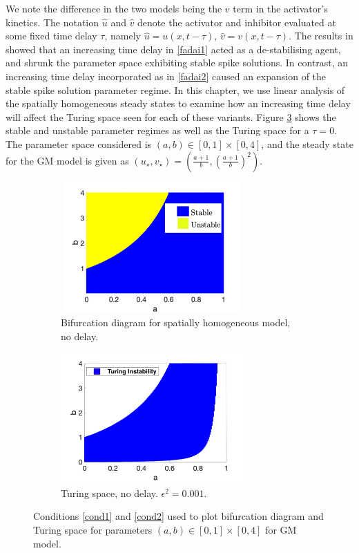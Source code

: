 We note the difference in the two models being the $v$ term in the activator's kinetics. The notation $\hat{u}$ and $\hat{v}$ denote the activator and inhibitor evaluated at some fixed time delay $\tau$, namely $\hat{u}=u(x,t-\tau)$, $\hat{v}=v(x,t-\tau)$. The results in \cite{fadai1,fadai2} showed that an increasing time delay in \eqref{fadai1} acted as a de-stabilising agent, and shrunk the parameter space exhibiting stable spike solutions. In contrast, an increasing time delay incorporated as in \eqref{fadai2} caused an expansion of the stable spike solution parameter regime. In this chapter, we use linear analysis of the spatially homogeneous steady states to examine how an increasing time delay will affect the Turing space seen for each of these variants. Figure \ref{fig:gmspace} shows the stable and unstable parameter regimes as well as the Turing space for a $\tau=0$. The parameter space considered is $(a,b)\in[0,1]\times[0,4]$, and the steady state for the GM model is given as $(u_\star,v_\star)=\left(\frac{a+1}{b},\left(\frac{a+1}{b}\right)^2\right)$.

\begin{figure}[H]
    \centering
    \begin{subfigure}[t]{0.45\textwidth}
        \centering
        \includegraphics[width=7cm,height = 5cm]{bifgm.png}
        \caption{Bifurcation diagram for spatially homogeneous model, no delay.}
        \label{fig:bifgm}
    \end{subfigure}
    \hfill
    \begin{subfigure}[t]{0.45\textwidth}
        \centering
        \includegraphics[width=7cm,height = 5cm]{turingspacegm.png}
        \caption{Turing space, no delay. $\epsilon^2=0.001$.}
        \label{fig:turingspacegm}
    \end{subfigure}
    \caption{Conditions \eqref{cond1} and \eqref{cond2} used to plot bifurcation diagram and Turing space for parameters $(a,b)\in[0,1]\times[0,4]$ for GM model.}
    \label{fig:gmspace}
\end{figure}

